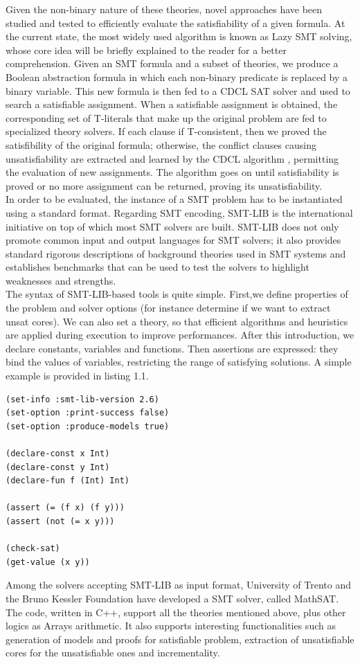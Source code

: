 Given the non-binary nature of these theories, novel approaches have been studied and tested to efficiently evaluate the satisfiability of a given formula. At the current state, the most widely used algorithm is known as Lazy SMT solving, whose core idea will be briefly explained to the reader for a better comprehension. Given an SMT formula and a subset of theories, we produce a Boolean abstraction formula in which each non-binary predicate is replaced by a binary variable. This new formula is then fed to a CDCL SAT solver and used to search a satisfiable assignment. When a satisfiable assignment is obtained, the corresponding set of T-literals that make up the original problem are fed to specialized theory solvers. If each clause if T-consistent, then we proved the satisfibility of the original formula; otherwise, the conflict clauses causing unsatisfiability are extracted and learned by the CDCL algorithm , permitting the evaluation of new assignments. The algorithm goes on until satisfiability is proved or no more assignment can be returned, proving its unsatisfiability. \\
In order to be evaluated, the instance of a SMT problem has to be instantiated using a standard format. Regarding SMT encoding, SMT-LIB is the international initiative on top of which most SMT solvers are built. SMT-LIB does not only promote common input and output languages for SMT solvers; it also provides standard rigorous descriptions of background theories used in SMT systems and establishes benchmarks that can be used to test the solvers to highlight weaknesses and strengths. \\
The syntax of SMT-LIB-based tools is quite simple. First,we define properties of the problem and solver options (for instance determine if we want to extract unsat cores). We can also set a theory, so that efficient algorithms and heuristics are applied during execution to improve performances. After this introduction, we declare constants, variables and functions. Then assertions are expressed: they bind the values of variables, restricting the range of satisfying solutions. A simple example is provided in listing 1.1. \\
\begin{lstlisting}[style=interfaces,caption=An example of SMT-LIB encoding.]
(set-info :smt-lib-version 2.6)
(set-option :print-success false)
(set-option :produce-models true)

(declare-const x Int)
(declare-const y Int)
(declare-fun f (Int) Int)

(assert (= (f x) (f y)))
(assert (not (= x y)))

(check-sat)
(get-value (x y))
\end{lstlisting}
Among the solvers accepting SMT-LIB as input format, University of Trento and the Bruno Kessler Foundation have developed a SMT solver, called MathSAT. The code, written in C++, support all the theories mentioned above, plus other logics as Arrays arithmetic. It also supports interesting functionalities such as generation of models and proofs for satisfiable problem, extraction of unsatisfiable cores for the unsatisfiable ones and incrementality.


